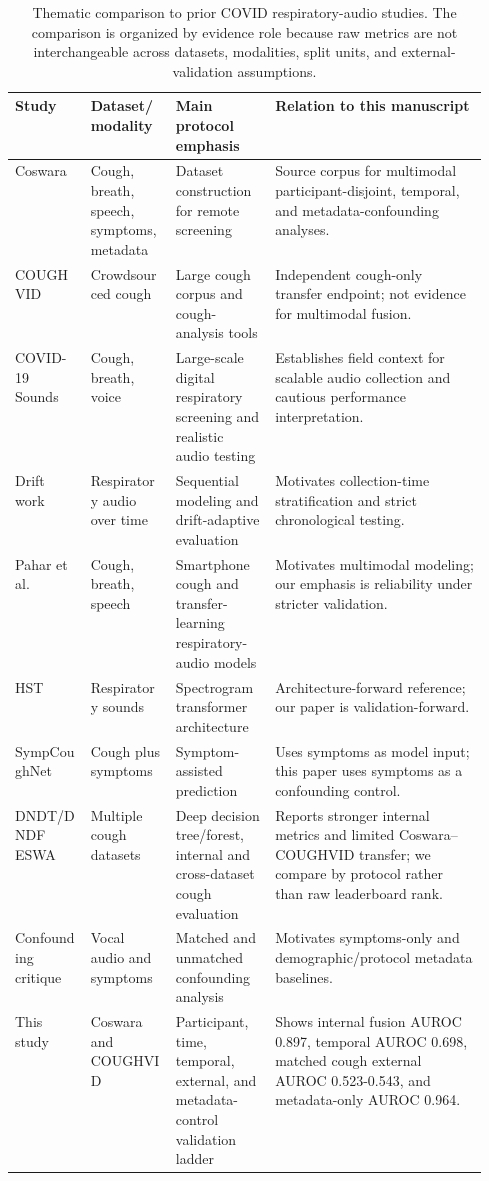 \documentclass[preprint,12pt]{elsarticle}
\begin{document}
\begin{table}[t]
\centering
\caption{Thematic comparison to prior COVID respiratory-audio studies. The comparison is organized by evidence role because raw metrics are not interchangeable across datasets, modalities, split units, and external-validation assumptions.}
\label{tab:prior-work}
\scriptsize
\setlength{\tabcolsep}{2.5pt}
\begin{tabularx}{\linewidth}{p{0.16\linewidth} p{0.18\linewidth} p{0.21\linewidth} X}
\toprule
Study & Dataset/modality & Main protocol emphasis & Relation to this manuscript \\
\midrule
Coswara \citep{bhattacharya2023coswara} & Cough, breath, speech, symptoms, metadata & Dataset construction for remote screening & Source corpus for multimodal participant-disjoint, temporal, and metadata-confounding analyses. \\
COUGHVID \citep{orlandic2021coughvid} & Crowdsourced cough & Large cough corpus and cough-analysis tools & Independent cough-only transfer endpoint; not evidence for multimodal fusion. \\
COVID-19 Sounds \citep{xia2021covid,han2022sounds} & Cough, breath, voice & Large-scale digital respiratory screening and realistic audio testing & Establishes field context for scalable audio collection and cautious performance interpretation. \\
Drift work \citep{dang2022longitudinal,ganitidis2025drift} & Respiratory audio over time & Sequential modeling and drift-adaptive evaluation & Motivates collection-time stratification and strict chronological testing. \\
Pahar et al. \citep{pahar2021global,pahar2022transfer} & Cough, breath, speech & Smartphone cough and transfer-learning respiratory-audio models & Motivates multimodal modeling; our emphasis is reliability under stricter validation. \\
HST \citep{aytekin2024hst} & Respiratory sounds & Spectrogram transformer architecture & Architecture-forward reference; our paper is validation-forward. \\
SympCoughNet \citep{lin2025sympcoughnet} & Cough plus symptoms & Symptom-assisted prediction & Uses symptoms as model input; this paper uses symptoms as a confounding control. \\
DNDT/DNDF ESWA \citep{islam2026dndf} & Multiple cough datasets & Deep decision tree/forest, internal and cross-dataset cough evaluation & Reports stronger internal metrics and limited Coswara--COUGHVID transfer; we compare by protocol rather than raw leaderboard rank. \\
Confounding critique \citep{coppock2024audio} & Vocal audio and symptoms & Matched and unmatched confounding analysis & Motivates symptoms-only and demographic/protocol metadata baselines. \\
This study & Coswara and COUGHVID & Participant, time, temporal, external, and metadata-control validation ladder & Shows internal fusion AUROC 0.897, temporal AUROC 0.698, matched cough external AUROC 0.523-0.543, and metadata-only AUROC 0.964. \\
\bottomrule
\end{tabularx}
\end{table}
\end{document}
